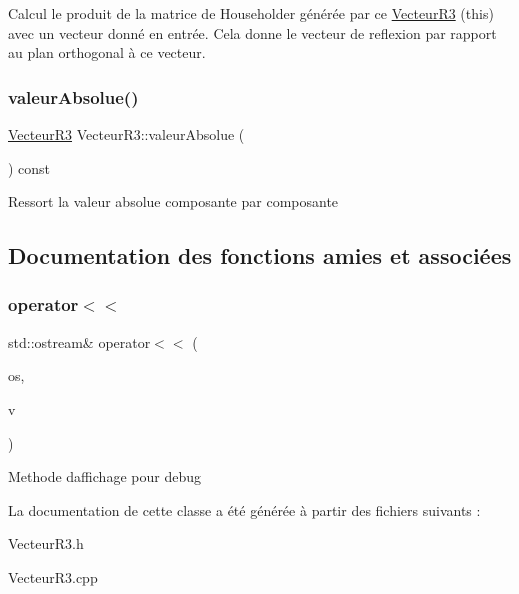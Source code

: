Calcul le produit de la matrice de Householder générée par ce \mbox{\hyperlink{class_vecteur_r3}{Vecteur\+R3}} (this) avec un vecteur donné en entrée. Cela donne le vecteur de reflexion par rapport au plan orthogonal à ce vecteur. \mbox{\label{class_vecteur_r3_a9cef6d7525f81938e2a7e71aa73c442c}} 
\subsubsection{\texorpdfstring{valeur\+Absolue()}{valeurAbsolue()}}
{\footnotesize\ttfamily \mbox{\hyperlink{class_vecteur_r3}{Vecteur\+R3}} Vecteur\+R3\+::valeur\+Absolue (\begin{DoxyParamCaption}{ }\end{DoxyParamCaption}) const}

Ressort la valeur absolue composante par composante 

\subsection{Documentation des fonctions amies et associées}
\mbox{\label{class_vecteur_r3_a1ef8b2a2f31c15f4f7765caad34796ca}} 
\subsubsection{\texorpdfstring{operator$<$$<$}{operator<<}}
{\footnotesize\ttfamily std\+::ostream\& operator$<$$<$ (\begin{DoxyParamCaption}\item[{std\+::ostream \&}]{os,  }\item[{const \mbox{\hyperlink{class_vecteur_r3}{Vecteur\+R3}} \&}]{v }\end{DoxyParamCaption})\hspace{0.3cm}{\ttfamily [friend]}}

Methode d\textquotesingle{}affichage pour debug 

La documentation de cette classe a été générée à partir des fichiers suivants \+:\begin{DoxyCompactItemize}
\item 
Vecteur\+R3.\+h\item 
Vecteur\+R3.\+cpp\end{DoxyCompactItemize}
